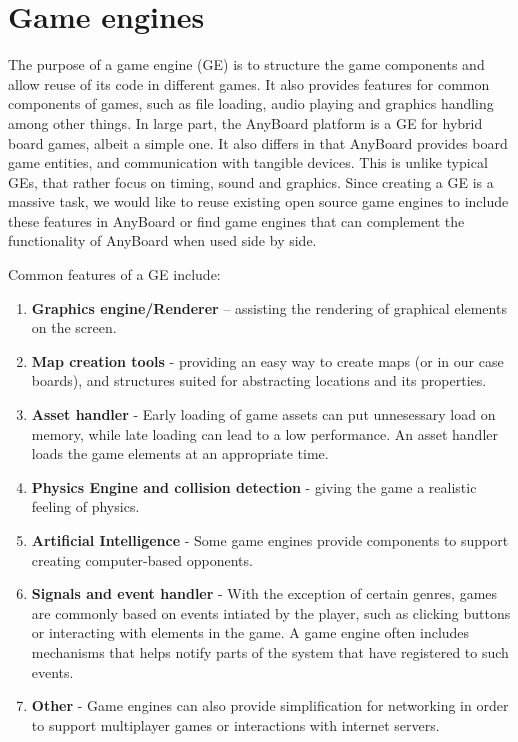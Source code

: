 \section{Game engines}
The purpose of a game engine (GE) is to structure the game components and allow reuse of its code in different games. It also provides features for common components of games, such as file loading, audio playing and graphics handling among other things. In large part, the AnyBoard platform is a GE for hybrid board games, albeit a simple one. It also differs in that AnyBoard provides board game entities, and communication with tangible devices. This is unlike typical GEs, that rather focus on timing, sound and graphics. Since creating a GE is a massive task, we would like  to reuse existing open source game engines to include these features in AnyBoard or find game engines that can complement the functionality of AnyBoard when used side by side.

Common features of a GE include:
\begin{enumerate}
\item \textbf{Graphics engine/Renderer} – assisting the rendering of graphical elements on the screen. 
\item \textbf{Map creation tools} - providing an easy way to create maps (or in our case boards), and structures suited for abstracting locations and its properties.
\item \textbf{Asset handler} - Early loading of game assets can put unnesessary load on memory, while late loading can lead to a low performance. An asset handler loads the game elements at an appropriate time. 
\item \textbf{Physics Engine and collision detection} - giving the game a realistic feeling of physics. 
\item \textbf{Artificial Intelligence} - Some game engines provide components to support creating computer-based opponents.
\item \textbf{Signals and event handler} - With the exception of certain genres, games are commonly based on events intiated by the player, such as clicking buttons or interacting with elements in the game. A game engine often includes mechanisms that helps notify parts of the system that have registered to such events.
\item \textbf{Other} - Game engines can also provide simplification for networking in order to support multiplayer games or interactions with internet servers.
\end{enumerate}

